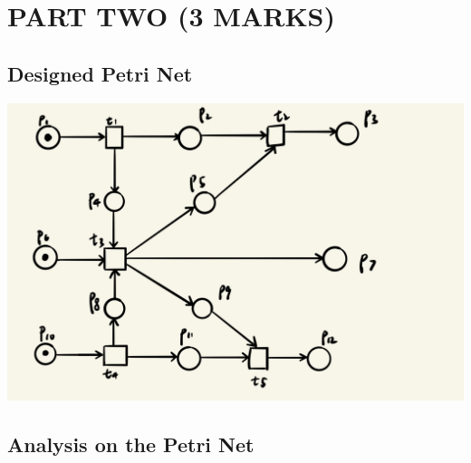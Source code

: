 \documentclass[runningheads]{llncs}
\begin{document}
\section{PART TWO (3 MARKS)}
\subsection{Designed Petri Net}
\includegraphics[scale=0.2]{car-racing.jpeg}


\subsection{Analysis on the Petri Net}

\end{document}
